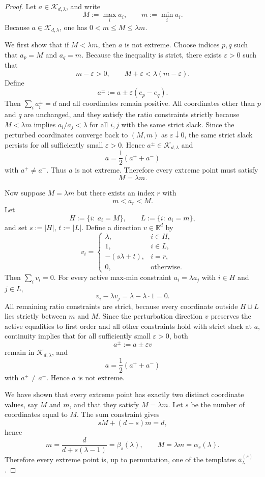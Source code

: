 \documentclass[11pt]{amsart}
\theoremstyle{definition}
\newcommand{\R}{\mathbb R}
\newcommand{\cK}{\mathcal K}
\begin{document}
\begin{proof}
Let $a\in\cK_{d,\lambda}$, and write
\[
M:=\max_i a_i,
\qquad
m:=\min_i a_i.
\]
Because $a\in\cK_{d,\lambda}$, one has $0<m\le M\le \lambda m$.

We first show that if $M<\lambda m$, then $a$ is not extreme. Choose indices $p,q$ such that $a_p=M$ and $a_q=m$. Because the inequality is strict, there exists $\varepsilon>0$ such that
\[
m-\varepsilon>0,
\qquad
M+\varepsilon<\lambda(m-\varepsilon).
\]
Define
\[
a^\pm:=a\pm \varepsilon(e_p-e_q).
\]
Then $\sum_i a_i^\pm=d$ and all coordinates remain positive. All coordinates other than $p$ and $q$ are unchanged, and they satisfy the ratio constraints strictly because $M<\lambda m$ implies $a_i/a_j<\lambda$ for all $i,j$ with the same strict slack. Since the perturbed coordinates converge back to $(M,m)$ as $\varepsilon\downarrow 0$, the same strict slack persists for all sufficiently small $\varepsilon>0$. Hence $a^\pm\in\cK_{d,\lambda}$ and
\[
a=\frac12(a^++a^-)
\]
with $a^+\neq a^-$. Thus $a$ is not extreme. Therefore every extreme point must satisfy
\[
M=\lambda m.
\]

Now suppose $M=\lambda m$ but there exists an index $r$ with
\[
m<a_r<M.
\]
Let
\[
H:=\{i:\ a_i=M\},
\qquad
L:=\{i:\ a_i=m\},
\]
and set $s:=|H|$, $t:=|L|$. Define a direction $v\in\R^d$ by
\[
v_i=
\begin{cases}
\lambda, & i\in H,\\
1, & i\in L,\\
-(s\lambda+t), & i=r,\\
0, & \text{otherwise}.
\end{cases}
\]
Then $\sum_i v_i=0$. For every active max-min constraint $a_i=\lambda a_j$ with $i\in H$ and $j\in L$,
\[
v_i-\lambda v_j=\lambda-\lambda\cdot 1=0.
\]
All remaining ratio constraints are strict, because every coordinate outside $H\cup L$ lies strictly between $m$ and $M$. Since the perturbation direction $v$ preserves the active equalities to first order and all other constraints hold with strict slack at $a$, continuity implies that for all sufficiently small $\varepsilon>0$, both
\[
a^\pm:=a\pm \varepsilon v
\]
remain in $\cK_{d,\lambda}$, and
\[
a=\frac12(a^++a^-)
\]
with $a^+\neq a^-$. Hence $a$ is not extreme.

We have shown that every extreme point has exactly two distinct coordinate values, say $M$ and $m$, and that they satisfy $M=\lambda m$. Let $s$ be the number of coordinates equal to $M$. The sum constraint gives
\[
sM+(d-s)m=d,
\]
hence
\[
m=\frac{d}{d+s(\lambda-1)}=\beta_s(\lambda),
\qquad
M=\lambda m=\alpha_s(\lambda).
\]
Therefore every extreme point is, up to permutation, one of the templates $a^{(s)}_\lambda$.


\end{proof}
\end{document}
